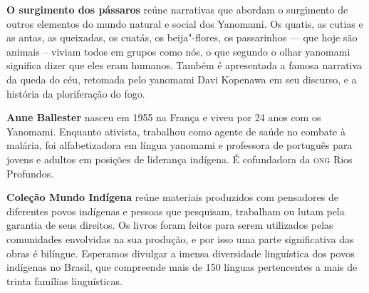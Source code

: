 \textbf{O surgimento dos pássaros} reúne narrativas que abordam o surgimento de outros elementos do mundo natural e social dos Yanomami. Os quatis, as cutias e as antas, as queixadas, os cuatás, os beija"-flores, os passarinhos --- que hoje são animais -- viviam todos em grupos como nós, o que segundo o olhar yanomami significa dizer que eles eram humanos. Também é apresentada a famosa narrativa da queda do céu, retomada pelo yanomami Davi Kopenawa em seu discurso, e a história da ploriferação do fogo. 

\textbf{Anne Ballester} nasceu em 1955 na França e viveu por 24 anos com os Yanomami. Enquanto ativista, trabalhou como agente de saúde no combate à malária, foi alfabetizadora em língua yanomami e professora de português para jovens e adultos em posições de liderança indígena. É cofundadora da \textsc{ong} Rios Profundos. 

\textbf{Coleção Mundo Indígena} reúne materiais produzidos com pensadores de diferentes povos indígenas e pessoas que pesquisam, trabalham ou lutam pela garantia de seus direitos. Os livros foram feitos para serem utilizados pelas comunidades envolvidas na sua produção, e por isso uma parte significativa das obras é bilíngue. Esperamos divulgar a imensa diversidade linguística dos povos indígenas no Brasil, que compreende mais de 150 línguas pertencentes a mais de trinta famílias linguísticas.



